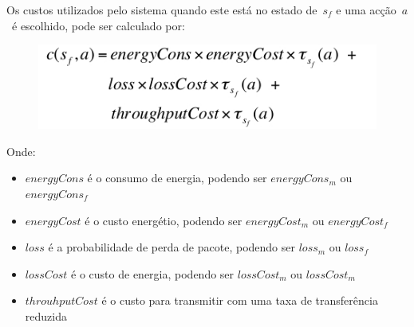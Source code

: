 \begin{frame}
  \footnotesize Os custos utilizados pelo sistema quando este está no estado de \alert{$s_{f}$} e uma acção \alert{$a$} é escolhido, pode ser calculado por:
  \begin{figure}
    \includegraphics[scale=0.37]{./Figures/form4}
  \end{figure}
  \scriptsize Onde:
  \begin{itemize}
    \item \alert{$energyCons$} é o consumo de energia, podendo ser \alert{$energyCons_{m}$} ou \alert{$energyCons_{f}$}
    \item \alert{$energyCost$} é o custo energétio, podendo ser \alert{$energyCost_{m}$} ou \alert{$energyCost_{f}$}
    \item \alert{$loss$} é a probabilidade de perda de pacote, podendo ser \alert{$loss_{m}$} ou \alert {$loss_{f}$}
    \item \alert{$lossCost$} é o custo de energia, podendo ser \alert{$lossCost_{m}$} ou \alert{$lossCost_{m}$}
    \item \alert{$throuhputCost$} é o custo para transmitir com uma taxa de transferência reduzida
  \end{itemize}
\end{frame}
%
%
%

